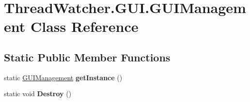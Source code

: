 \hypertarget{class_thread_watcher_1_1_g_u_i_1_1_g_u_i_management}{\section{Thread\+Watcher.\+G\+U\+I.\+G\+U\+I\+Management Class Reference}
\label{class_thread_watcher_1_1_g_u_i_1_1_g_u_i_management}
}
\subsection*{Static Public Member Functions}
\begin{DoxyCompactItemize}
\item 
\hypertarget{class_thread_watcher_1_1_g_u_i_1_1_g_u_i_management_a27d68c391d325494c07a41419efdb47d}{static \hyperlink{class_thread_watcher_1_1_g_u_i_1_1_g_u_i_management}{G\+U\+I\+Management} {\bfseries get\+Instance} ()}\label{class_thread_watcher_1_1_g_u_i_1_1_g_u_i_management_a27d68c391d325494c07a41419efdb47d}

\item 
\hypertarget{class_thread_watcher_1_1_g_u_i_1_1_g_u_i_management_ab9d4db6431967374e05dff9f3dcdaea2}{static void {\bfseries Destroy} ()}\label{class_thread_watcher_1_1_g_u_i_1_1_g_u_i_management_ab9d4db6431967374e05dff9f3dcdaea2}

\end{DoxyCompactItemize}
